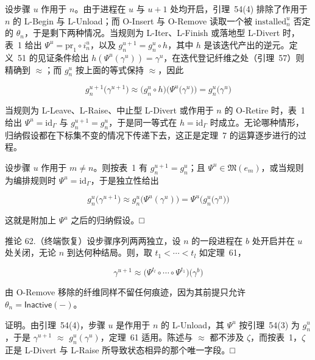 设步骤 \(u\) 作用于 \(n\)。由于进程在 \(u\) 与 \(u+1\) 处均开启，引理~54(4) 排除了作用于 \(n\) 的 L-Begin 与 L-Unload；而 O-Insert 与 O-Remove 读取一个被 \(\mathrm { i n s t a l l e d } _ { n } ^ { u }\) 否定的 \(\theta _ { n }\)，于是剩下两种情况。当规则为 L-Iter、L-Finish 或落地型 L-Divert 时，表~1 给出 \(\Psi ^ { u } = \mathrm { p r } _ { 1 } \circ i _ { n } ^ { u }\)，以及 \(g _ { n } ^ { u + 1 } = g _ { n } ^ { u } \circ h\)，其中 \(h\) 是该迭代产出的逆元。定义~51 的见证条件给出 \(h ( \Psi ^ { u } ( \gamma ^ { u } ) ) = \gamma ^ { u }\)，在迭代登记纤维之处（引理~57）则精确到 $\approx$；而 \(g _ { n } ^ { u }\) 按上面的等式保持 $\approx$，因此

\[
g _ { n } ^ { u + 1 } \big ( \gamma ^ { u + 1 } \big ) \approx \big ( g _ { n } ^ { u } \circ h \big ) \big ( \Psi ^ { u } \big ( \gamma ^ { u } \big ) \big ) = g _ { n } ^ { u } \big ( \gamma ^ { u } \big )
\]

当规则为 L-Leave、L-Raise、中止型 L-Divert 或作用于 \(n\) 的 O-Retire 时，表~1 给出 \(\Psi ^ { u } = \mathrm { i d } _ { \Gamma }\) 与 \(g _ { n } ^ { u + 1 } = g _ { n } ^ { u }\)，于是同一等式在 \(h = \mathrm { i d } _ { \Gamma }\) 时成立。无论哪种情形，归纳假设都在下标集不变的情况下传递下去，这正是定理~7 的运算逐步进行的过程。

设步骤 \(u\) 作用于 \(m \neq n\)。则按表~1 有 \(g _ { n } ^ { u + 1 } = g _ { n } ^ { u }\)；且 \(\Psi ^ { u } \in \mathfrak { M } ( e _ { m } )\)，或当规则为编排规则时 \(\Psi ^ { u } = \mathrm { i d } _ { \Gamma }\)，于是独立性给出

\[
g _ { n } ^ { u } \bigl ( \gamma ^ { u + 1 } \bigr ) \approx g _ { n } ^ { u } \bigl ( \Psi ^ { u } ( \gamma ^ { u } ) \bigr ) = \Psi ^ { u } \bigl ( g _ { n } ^ { u } \bigl ( \gamma ^ { u } \bigr ) \bigr )
\]

这就是附加上 \(\Psi ^ { u }\) 之后的归纳假设。□

推论 62.（终端恢复）设步骤序列两两独立，设 \(n\) 的一段进程在 \(b\) 处开启并在 \(u\) 处关闭，无论 \(n\) 到达何种结局。则，取 \(t _ { 1 } < \cdots < t _ { l }\) 如定理~61，

\[
\gamma ^ { u + 1 } \approx \bigl ( \Psi ^ { t _ { l } } \circ \cdots \circ \Psi ^ { t _ { 1 } } \bigr ) \bigl ( \gamma ^ { b } \bigr )\tag{57}
\]

由 O-Remove 移除的纤维同样不留任何痕迹，因为其前提只允许 \(\theta _ { n } = \mathsf { I n a c t i v e } ( - )\)。

证明。由引理~54(4)，步骤 \(u\) 是作用于 \(n\) 的 L-Unload，其 \(\Psi ^ { u }\) 按引理~54(3) 为 \(g _ { n } ^ { u }\)，于是 \(\gamma ^ { u + 1 }\) $\approx$ \(g _ { n } ^ { u } ( \gamma ^ { u } )\)，定理~61 适用。陈述与 $\approx$ 都不涉及 \(\zeta\)，而按表~1，\(\zeta\) 正是 L-Divert 与 L-Raise 所导致状态相异的那个唯一字段。□

